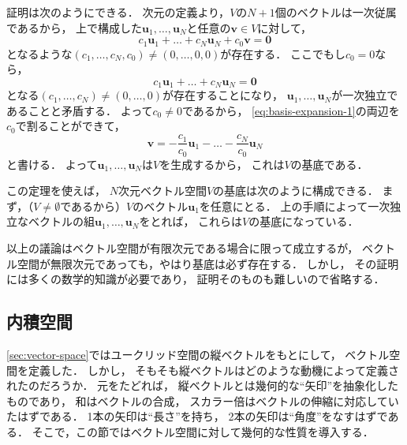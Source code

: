 \documentclass[
]{sotsu}
\begin{document}
証明は次のようにできる．
次元の定義より，$V$の$N + 1$個のベクトルは一次従属であるから，
上で構成した$\symbf{u}_1, \dots, \symbf{u}_N$と任意の$\symbf{v} \in V$に対して，
\begin{equation}
    \label{eq:basis-expansion-1}
    c_1 \symbf{u}_1 + \dots + c_N \symbf{u}_N + c_0 \symbf{v} = \symbf{0}
\end{equation}
となるような$(c_1, \dots, c_N, c_0) \neq (0, \dots, 0, 0)$が存在する．
ここでもし$c_0 = 0$なら，
\begin{equation*}
    c_1 \symbf{u}_1 + \dots + c_N \symbf{u}_N = \symbf{0}
\end{equation*}
となる$(c_1, \dots, c_N) \neq (0, \dots, 0)$が存在することになり，
$\symbf{u}_1, \dots, \symbf{u}_N$が一次独立であることと矛盾する．
よって$c_0 \neq 0$であるから，
\cref{eq:basis-expansion-1}の両辺を$c_0$で割ることができて，
\begin{equation*}
    \symbf{v} = -\frac{c_1}{c_0} \symbf{u}_1 - \dots - \frac{c_N}{c_0} \symbf{u}_N
\end{equation*}
と書ける．
よって$\symbf{u}_1, \dots, \symbf{u}_N$は$V$を生成するから，
これは$V$の基底である．\qedsymbol



\quad 
この定理を使えば，
$N$次元ベクトル空間$V$の基底は次のように構成できる．
まず，（$V \neq \emptyset$であるから）$V$のベクトル$\symbf{u}_1$を任意にとる．
上の手順によって一次独立なベクトルの組$\symbf{u}_1, \dots, \symbf{u}_N$をとれば，
これらは$V$の基底になっている．



以上の議論はベクトル空間が有限次元である場合に限って成立するが，
ベクトル空間が無限次元であっても，やはり基底は必ず存在する．
しかし，
その証明には多くの数学的知識が必要であり，
証明そのものも難しいので省略する．





\subsection{内積空間}
\label{sec:topological-vector-space}

\cref{sec:vector-space}ではユークリッド空間の縦ベクトルをもとにして，
ベクトル空間を定義した．
しかし，
そもそも縦ベクトルはどのような動機によって定義されたのだろうか．
元をたどれば，
縦ベクトルとは幾何的な``矢印''を抽象化したものであり，
和はベクトルの合成，
スカラー倍はベクトルの伸縮に対応していたはずである．
1本の矢印は``長さ''を持ち，
2本の矢印は``角度''をなすはずである．
そこで，この節ではベクトル空間に対して幾何的な性質を導入する．
\end{document}
